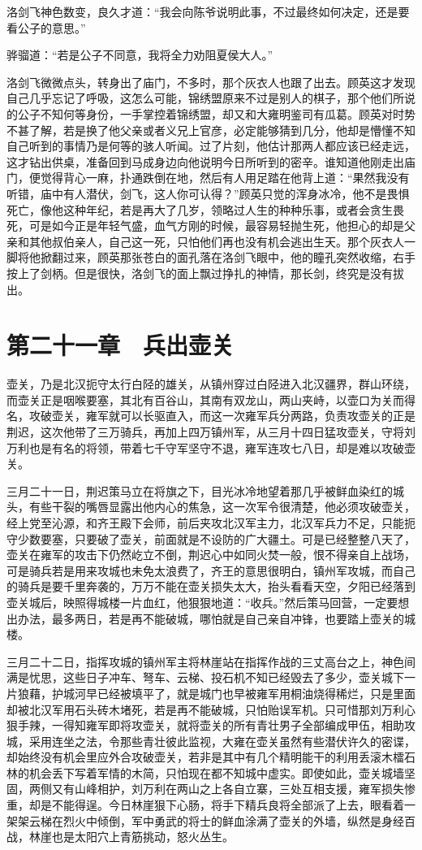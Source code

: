 洛剑飞神色数变，良久才道：“我会向陈爷说明此事，不过最终如何决定，还是要看公子的意思。”

骅骝道：“若是公子不同意，我将全力劝阻夏侯大人。”

洛剑飞微微点头，转身出了庙门，不多时，那个灰衣人也跟了出去。顾英这才发现自己几乎忘记了呼吸，这怎么可能，锦绣盟原来不过是别人的棋子，那个他们所说的公子不知何等身份，一手掌控着锦绣盟，却又和大雍明鉴司有瓜葛。顾英对时势不甚了解，若是换了他父亲或者义兄上官彦，必定能够猜到几分，他却是懵懂不知自己听到的事情乃是何等的骇人听闻。过了片刻，他估计那两人都应该已经走远，这才钻出供桌，准备回到马成身边向他说明今日所听到的密辛。谁知道他刚走出庙门，便觉得背心一麻，扑通跌倒在地，然后有人用足踏在他背上道：“果然我没有听错，庙中有人潜伏，剑飞，这人你可认得？”顾英只觉的浑身冰冷，他不是畏惧死亡，像他这种年纪，若是再大了几岁，领略过人生的种种乐事，或者会贪生畏死，可是如今正是年轻气盛，血气方刚的时候，最容易轻抛生死，他担心的却是父亲和其他叔伯亲人，自己这一死，只怕他们再也没有机会逃出生天。那个灰衣人一脚将他掀翻过来，顾英那张苍白的面孔落在洛剑飞眼中，他的瞳孔突然收缩，右手按上了剑柄。但是很快，洛剑飞的面上飘过挣扎的神情，那长剑，终究是没有拔出。

\chapter{第二十一章　兵出壶关}

壶关，乃是北汉扼守太行白陉的雄关，从镇州穿过白陉进入北汉疆界，群山环绕，而壶关正是咽喉要塞，其北有百谷山，其南有双龙山，两山夹峙，以壶口为关而得名，攻破壶关，雍军就可以长驱直入，而这一次雍军兵分两路，负责攻壶关的正是荆迟，这次他带了三万骑兵，再加上四万镇州军，从三月十四日猛攻壶关，守将刘万利也是有名的将领，带着七千守军坚守不退，雍军连攻七八日，却是难以攻破壶关。

三月二十一日，荆迟策马立在将旗之下，目光冰冷地望着那几乎被鲜血染红的城头，有些干裂的嘴唇显露出他内心的焦急，这一次军令很清楚，他必须攻破壶关，经上党至沁源，和齐王殿下会师，前后夹攻北汉军主力，北汉军兵力不足，只能扼守少数要塞，只要破了壶关，前面就是不设防的广大疆土。可是已经整整八天了，壶关在雍军的攻击下仍然屹立不倒，荆迟心中如同火焚一般，恨不得亲自上战场，可是骑兵若是用来攻城也未免太浪费了，齐王的意思很明白，镇州军攻城，而自己的骑兵是要千里奔袭的，万万不能在壶关损失太大，抬头看看天空，夕阳已经落到壶关城后，映照得城楼一片血红，他狠狠地道：“收兵。”然后策马回营，一定要想出办法，最多两日，若是再不能破城，哪怕就是自己亲自冲锋，也要踏上壶关的城楼。

三月二十二日，指挥攻城的镇州军主将林崖站在指挥作战的三丈高台之上，神色间满是忧思，这些日子冲车、弩车、云梯、投石机不知已经毁去了多少，壶关城下一片狼藉，护城河早已经被填平了，就是城门也早被雍军用桐油烧得稀烂，只是里面却被北汉军用石头砖木堵死，若是再不能破城，只怕贻误军机。只可惜那刘万利心狠手辣，一得知雍军即将攻壶关，就将壶关的所有青壮男子全部编成甲伍，相助攻城，采用连坐之法，令那些青壮彼此监视，大雍在壶关虽然有些潜伏许久的密谍，却始终没有机会里应外合攻破壶关，若非是其中有几个精明能干的利用丢滚木檑石林的机会丢下写着军情的木简，只怕现在都不知城中虚实。即使如此，壶关城墙坚固，两侧又有山峰相护，刘万利在两山之上各自立寨，三处互相支援，雍军损失惨重，却是不能得逞。今日林崖狠下心肠，将手下精兵良将全部派了上去，眼看着一架架云梯在烈火中倾倒，军中勇武的将士的鲜血涂满了壶关的外墙，纵然是身经百战，林崖也是太阳穴上青筋挑动，怒火丛生。

